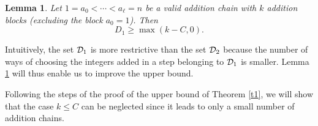 \documentclass{article}
\newtheorem{lemma}[theorem]{Lemma}
\theoremstyle{definition}
\begin{document}
\begin{lemma}\label{ub12}
Let $1=a_0<\cdots<a_{\ell}=n$ be a valid addition chain with $k$ addition blocks (excluding the block $a_0=1$).  Then
$$
D_1\ge \max(k-C,0).
$$
\end{lemma}
Intuitively, the set ${\cal D}_1$ is more restrictive than the set ${\cal D}_2$ because the number of ways of choosing the integers added in a step belonging to ${\cal D}_1$ is smaller.  Lemma \ref{ub12} will thus enable us to improve the upper bound.



Following the steps of the proof of the upper bound of  Theorem \ref{t1}, we will show that the case $k\leq C$ can be neglected since it leads to only a small number of addition chains.
\end{document}

